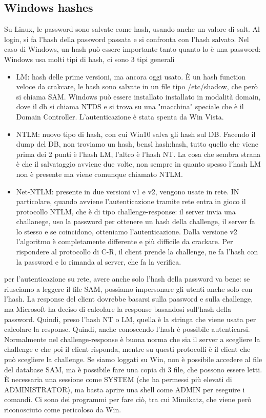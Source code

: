 \documentclass{article}
\begin{document}
\subsection{Windows hashes}
Su Linux, le password sono salvate come hash, usando anche un valore di salt. Al login, si fa l'hash della password passata e si confronta con l'hash salvato. Nel caso di Windows, un hash può essere importante tanto quanto lo è una password: Windows usa molti tipi di hash, ci sono 3 tipi generali
\begin{itemize}
\item LM: hash delle prime versioni, ma ancora oggi usato. È un hash function veloce da crakcare, le hash sono salvate in un file tipo \textsf{/etc/shadow}, che però si chiama \textsf{SAM}. Windows può essere installato installato in modalità domain, dove il db si chiama NTDS e si trova su una "macchina" speciale che è il Domain Controller. L'autenticazione è stata spenta da Win Vista.
\item NTLM: nuovo tipo di hash, con cui Win10 salva gli hash sul DB. Facendo il dump del DB, non troviamo un hash, bensì hash:hash, tutto quello che viene prima dei 2 punti è l'hash LM, l'altro è l'hash NT. La cosa che sembra strana è che il salvataggio avviene due volte, non sempre in quanto spesso l'hash LM non è presente ma viene comunque chiamato NTLM.
\item Net-NTLM: presente in due versioni v1 e v2, vengono usate in rete. IN particolare, quando avviene l'autenticazione tramite rete entra in gioco il protocollo NTLM, che è di tipo challenge-response: il server invia una challanege, uso la password per ottenere un hash della challenge, il server fa lo stesso e se coincidono, otteniamo l'autenticazione. Dalla versione v2 l'algoritmo è completamente differente e più difficile da crackare. Per rispondere al protocollo di C-R, il client prende la challenge, ne fa l'hash con la password e lo rimanda al server, che fa la verifica.
\end{itemize} 
per l'autenticazione su rete, avere anche solo l'hash della password va bene: se riusciamo a leggere il file SAM, possiamo impersonare gli utenti anche solo con l'hash. La response del client dovrebbe basarsi sulla password e sulla challenge, ma Microsoft ha deciso di calcolare la response basandosi sull'hash della password. Quindi, preso l'hash NT o LM, quella è la stringa che viene usata per calcolare la response. Quindi, anche conoscendo l'hash è possibile autenticarsi. Normalmente nel challenge-response è buona norma che sia il server a scegliere la challenge e che poi il client risponda, mentre su questi protocolli è il client che può scegliere la challenge. Se siamo loggati su Win, non è possibile accedere al file del database SAM, ma è possibile fare una copia di 3 file, che possono essere letti. È necessaria una sessione come SYSTEM (che ha permessi più elevati di ADMINISTRATOR), ma basta aprire una shell come ADMIN per eseguire i comandi. Ci sono dei programmi per fare ciò, tra cui Mimikatz, che viene però riconosciuto come pericoloso da Win.
\end{document}
